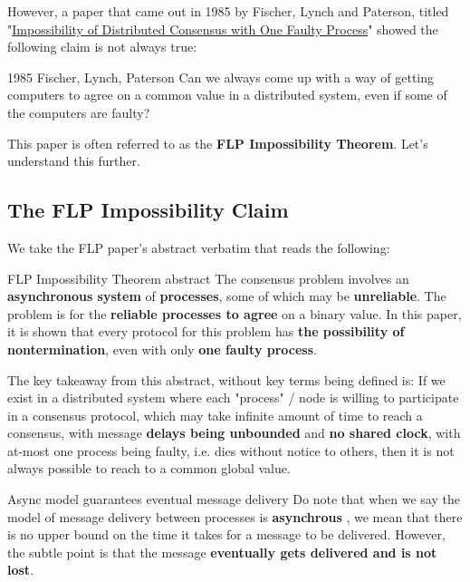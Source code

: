 However, a paper that came out in 1985 by Fischer, Lynch and Paterson, titled "\href{https://groups.csail.mit.edu/tds/papers/Lynch/jacm85.pdf}{Impossibility of Distributed Consensus with One Faulty Process}" showed the following claim is not always true: 

\begin{quotebox}{1985 Fischer, Lynch, Paterson}
    Can we always come up with a way of getting computers to agree on a common value in a distributed system, even if some of the computers are faulty?
\end{quotebox}

This paper is often referred to as the \textbf{FLP Impossibility Theorem}. Let's understand this further.

\subsection{The FLP Impossibility Claim}

We take the FLP paper's abstract verbatim that reads the following:

\begin{quotebox}{FLP Impossibility Theorem abstract}
    The consensus problem involves an \textbf{asynchronous system} of \textbf{processes}, some of which may be \textbf{unreliable}. The problem is for the \textbf{reliable processes to agree} on a binary value. In this paper, it is shown that every protocol for this problem has \textbf{the possibility of nontermination}, even with only \textbf{one faulty process}. 
\end{quotebox}

The key takeaway from this abstract, without key terms being defined is: If we exist in a distributed system where each "process" / node is willing to participate in a consensus protocol, which may take infinite amount of time to reach a consensus, with message \textbf{delays being unbounded} and \textbf{no shared clock}, with at-most one process being faulty, i.e. dies without notice to others, then it is not always possible to reach to a common global value.

\begin{alertbox}{Async model guarantees eventual message delivery}
    Do note that when we say the model of message delivery between processes is \textbf{asynchrous} , we mean that there is no upper bound on the time it takes for a message to be delivered. However, the subtle point is that the message \textbf{eventually gets delivered and is not lost}.
\end{alertbox}

